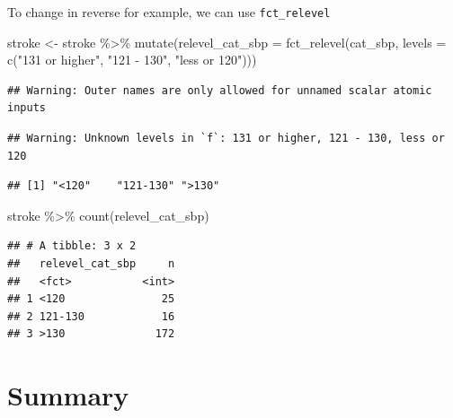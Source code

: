 \documentclass[
  10pt,
]{krantz}
\newenvironment{Shaded}{\begin{snugshade}}{\end{snugshade}}
\newcommand{\AttributeTok}[1]{\textcolor[rgb]{0.77,0.63,0.00}{#1}}
\newcommand{\FunctionTok}[1]{\textcolor[rgb]{0.00,0.00,0.00}{#1}}
\newcommand{\NormalTok}[1]{#1}
\newcommand{\OtherTok}[1]{\textcolor[rgb]{0.56,0.35,0.01}{#1}}
\newcommand{\SpecialCharTok}[1]{\textcolor[rgb]{0.00,0.00,0.00}{#1}}
\newcommand{\StringTok}[1]{\textcolor[rgb]{0.31,0.60,0.02}{#1}}
\begin{document}
To change in reverse for example, we can use \texttt{fct\_relevel}

\begin{Shaded}
\begin{Highlighting}[]
\NormalTok{stroke }\OtherTok{\textless{}{-}}\NormalTok{ stroke }\SpecialCharTok{\%\textgreater{}\%}
  \FunctionTok{mutate}\NormalTok{(}\AttributeTok{relevel\_cat\_sbp =} \FunctionTok{fct\_relevel}\NormalTok{(cat\_sbp, }\AttributeTok{levels =} \FunctionTok{c}\NormalTok{(}\StringTok{"131 or higher"}\NormalTok{, }
                                                       \StringTok{"121 {-} 130"}\NormalTok{,}
                                                       \StringTok{"less or 120"}\NormalTok{)))}
\end{Highlighting}
\end{Shaded}

\begin{verbatim}
## Warning: Outer names are only allowed for unnamed scalar atomic inputs
\end{verbatim}

\begin{verbatim}
## Warning: Unknown levels in `f`: 131 or higher, 121 - 130, less or 120
\end{verbatim}

\begin{Shaded}
\end{Shaded}

\begin{verbatim}
## [1] "<120"    "121-130" ">130"
\end{verbatim}

\begin{Shaded}
\begin{Highlighting}[]
\NormalTok{stroke }\SpecialCharTok{\%\textgreater{}\%} \FunctionTok{count}\NormalTok{(relevel\_cat\_sbp)}
\end{Highlighting}
\end{Shaded}

\begin{verbatim}
## # A tibble: 3 x 2
##   relevel_cat_sbp     n
##   <fct>           <int>
## 1 <120               25
## 2 121-130            16
## 3 >130              172
\end{verbatim}

\hypertarget{summary}{%
\section{Summary}\label{summary}}
\end{document}
